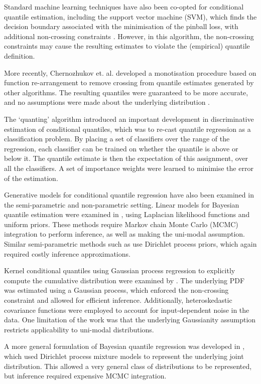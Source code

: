 \documentclass[twoside]{article} \usepackage{aistats2017}
\theoremstyle{definition}
\theoremstyle{remark}
\begin{document}
	Standard machine learning techniques have also been co-opted for conditional quantile estimation, including the support vector machine (SVM), which finds the decision boundary associated with the minimisation of the pinball loss, with additional non-crossing constraints \citep{Takeuchi2006}. However, in this algorithm, the non-crossing constraints may cause the resulting estimates to violate the (empirical) quantile definition.

	More recently, Chernozhukov et. al. developed a monotisation procedure based on function re-arrangement to remove crossing from quantile estimates generated by other algorithms. The resulting quantiles were guaranteed to be more accurate, and no assumptions were made about the underlying distribution \citep{Chernozhukov2010}.

	The `quanting' algorithm \citep{Langford2006} introduced an important development in discriminative estimation of conditional quantiles, which was to re-cast quantile regression as a classification problem. By placing a set of classifiers over the range of the regression, each classifier can be trained on whether the quantile is above or below it. The quantile estimate is then the expectation of this assignment, over all the classifiers.  A set of importance weights were learned to minimise the error of the estimation.

	Generative models for conditional quantile regression have also been examined in the semi-parametric and non-parametric setting. Linear models for Bayesian quantile estimation were examined in \cite{Yu2001}, using Laplacian likelihood functions and uniform priors. These methods require Markov chain Monte Carlo (MCMC) integration to perform inference, as well as making the uni-modal assumption. Similar semi-parametric methods such as \cite{Hjort2006, Hjort2009} use Dirichlet process priors, which again required costly inference approximations.

	Kernel conditional quantiles using Gaussian process regression to explicitly compute the cumulative distribution were examined by \cite{Quadrianto2009}. The underlying PDF was estimated using a Gaussian process, which enforced the non-crossing constraint and allowed for efficient inference. Additionally, heteroskedastic covariance functions were employed to account for input-dependent noise in the data. One limitation of the work was that the underlying Gaussianity assumption restricts applicability to uni-modal distributions.

	A more general formulation of Bayesian quantile regression was developed in \cite{Taddy2010}, which used Dirichlet process mixture models to represent the underlying joint distribution. This allowed a very general class of distributions to be represented, but inference required expensive MCMC integration.
\end{document}
